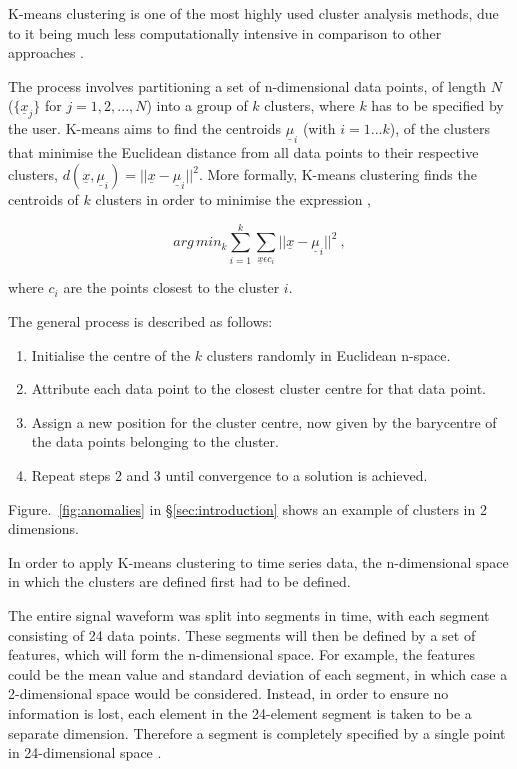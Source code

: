 K-means clustering is one of the most highly used cluster analysis methods, due to it being much less computationally intensive in comparison to other approaches \cite{Kanungo:2002:EKC:628329.628801}.

The process involves partitioning a set of n-dimensional data points, of length $N$ ($\{\underline{x}_j\}$ for $j=1,2,...,N$) into a group of $k$ clusters, where $k$ has to be specified by the user. K-means aims to find the centroids $\underline{\mu}_i$ (with $i=1...k$), of the clusters that minimise the Euclidean distance from all data points to their respective clusters, $d(\underline{x}, \underline{\mu}_i) = ||\underline{x}-\underline{\mu}_i||^2$. More formally, K-means clustering finds the centroids of $k$ clusters in order to minimise the expression \cite{596afe3f2b5a4ff3b8f4f9793ad2f4ee},

\begin{equation}
    arg\,min_k \sum_{i=1}^{k} \sum_{\underline{x} \epsilon c_i} ||\underline{x}-\underline{\mu}_i||^2 ~,
    \label{eq:K-means}
\end{equation}

where $c_i$ are the points closest to the cluster $i$.

The general process is described as follows:
\begin{enumerate}
    \item Initialise the centre of the $k$ clusters randomly in Euclidean n-space.
    \item Attribute each data point to the closest cluster centre for that data point. 
    \item Assign a new position for the cluster centre, now given by the barycentre of the data points belonging to the cluster.
    \item Repeat steps 2 and 3 until convergence to a solution is achieved.
\end{enumerate}

Figure.~\ref{fig:anomalies} in \S \ref{sec:introduction} shows an example of clusters in 2 dimensions. 

In order to apply K-means clustering to time series data, the n-dimensional space in which the clusters are defined first had to be defined. 

The entire signal waveform was split into segments in time, with each segment consisting of 24 data points. These segments will then be defined by a set of features, which will form the n-dimensional space. For example, the features could be the mean value and standard deviation of each segment, in which case a 2-dimensional space would be considered. Instead, in order to ensure no information is lost, each element in the 24-element segment is taken to be a separate dimension. Therefore a segment is completely specified by a single point in 24-dimensional space \cite{lin_vlachos_keogh_gunopulos_2004}.

